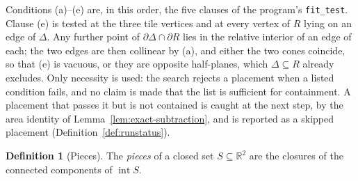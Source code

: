 \documentclass[11pt]{amsart}
\theoremstyle{definition}
\newtheorem{definition}[theorem]{Definition}
\theoremstyle{remark}
\begin{document}
Conditions (a)--(e) are, in this order, the five clauses of the program's
\texttt{fit\_test}.  Clause (e) is tested at the three tile vertices and at
every vertex of $R$ lying on an edge of $\Delta$.  Any further point of
$\partial\Delta\cap\partial R$ lies in the relative interior of an edge of
each; the two edges are then collinear by (a), and either the two cones
coincide, so that (e) is vacuous, or they are opposite half-planes, which
$\Delta\subseteq R$ already excludes.  Only necessity is used: the search
rejects a placement when a listed condition fails, and no claim is made that
the list is sufficient for containment.  A placement that passes it but is
not contained is caught at the next step, by the area identity of
Lemma~\ref{lem:exact-subtraction}, and is reported as a skipped placement
(Definition~\ref{def:runstatus}).

\begin{definition}[Pieces]\label{def:pieces}
The \emph{pieces} of a closed set $S\subseteq\mathbb R^2$ are the closures of
the connected components of $\operatorname{int}S$.
\end{definition}
\end{document}

